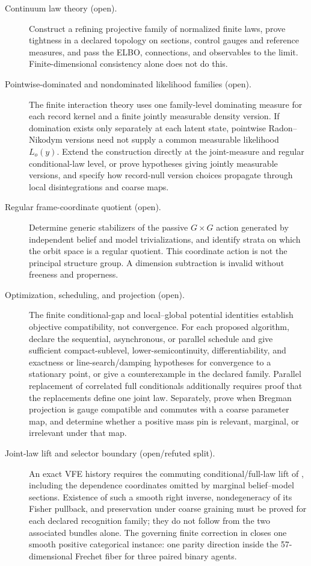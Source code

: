 \begin{description}
\item[Continuum law theory (open).]
Construct a refining projective family of normalized finite laws, prove
tightness in a declared topology on sections, control gauges and reference
measures, and pass the ELBO, connections, and observables to the limit.
Finite-dimensional consistency alone does not do this. 

\item[Pointwise-dominated and nondominated likelihood families (open).]
The finite interaction theory uses one family-level dominating measure for
each record kernel and a finite jointly measurable density version.  If
domination exists only separately at each latent state, pointwise
Radon--Nikodym versions need not supply a common measurable likelihood
$L_o(y)$.  Extend the construction directly at the joint-measure and regular
conditional-law level, or prove hypotheses giving jointly measurable versions,
and specify how record-null version choices propagate through local
disintegrations and coarse maps. 

\item[Regular frame-coordinate quotient (open).]
Determine generic stabilizers of the passive \(G\times G\) action generated by
independent belief and model trivializations, and identify strata on which the
orbit space is a regular quotient. This coordinate action is not the
principal structure group. A dimension subtraction is invalid without
freeness and properness. 

\item[Optimization, scheduling, and projection (open).]
The finite conditional-gap and local--global potential identities establish
objective compatibility, not convergence.  For each proposed algorithm,
declare the sequential, asynchronous, or parallel schedule and give sufficient
compact-sublevel, lower-semicontinuity, differentiability, and exactness or
line-search/damping hypotheses for convergence to a stationary point, or give
a counterexample in the declared family.  Parallel replacement of correlated
full conditionals additionally requires proof that the replacements define one
joint law.  Separately, prove when Bregman projection is gauge compatible and
commutes with a coarse parameter map, and determine whether a positive mass
pin is relevant, marginal, or irrelevant under that map. 

\item[Joint-law lift and selector boundary (open/refuted split).]
An exact VFE history requires the commuting conditional/full-law lift of
, including the dependence coordinates omitted
by marginal belief--model sections.  Existence of such a smooth right inverse,
nondegeneracy of its Fisher pullback, and preservation under coarse graining
must be proved for each declared recognition family; they do not follow from
the two associated bundles alone.  The governing finite correction in
 closes one smooth positive categorical
instance: one parity direction inside the 57-dimensional Frechet fiber for
three paired binary agents.


\end{description}
